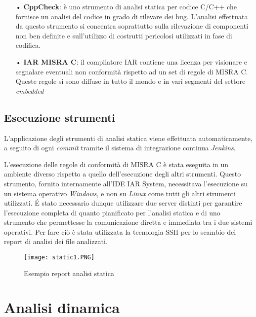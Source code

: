\begin{itemize}
\item[•] \textbf{CppCheck}: è uno strumento di analisi statica per codice C/C++ che fornisce un analisi del codice in grado di rilevare dei bug. L'analisi effettuata da questo strumento si concentra soprattutto sulla rilevazione di componenti non ben definite e sull'utilizzo di costrutti pericolosi utilizzati in fase di codifica.

\item[•] \textbf{IAR MISRA C}: il compilatore IAR contiene una licenza per visionare e segnalare eventuali non conformità rispetto ad un set di regole di MISRA C. Queste regole si sono diffuse in tutto il mondo e in vari segmenti del settore \textit{embedded}
\end{itemize}

\subsection{Esecuzione strumenti}
L'applicazione degli strumenti di analisi statica viene effettuata automaticamente, a seguito di ogni \textit{commit} tramite il sistema di integrazione continua \textit{Jenkins}.

L'esecuzione delle regole di conformità di MISRA C è stata eseguita in un ambiente diverso rispetto a quello dell'esecuzione degli altri strumenti. Questo strumento, fornito internamente all'IDE IAR System, necessitava l'esecuzione su un sistema operativo \textit{Windows}, e non su \textit{Linux} come tutti gli altri strumenti utilizzati. É stato necessario dunque utilizzare due server distinti per garantire l'esecuzione completa di quanto pianificato per l'analisi statica e di uno strumento che permettesse la comunicazione diretta e immediata tra i due sistemi operativi. Per fare ciò è stata utilizzata la tecnologia SSH per lo scambio dei report di analisi dei file analizzati.

\begin{figure}[H]
  \centering
  \texttt{[image: static1.PNG]}
  \caption{Esempio report analisi statica}
\end{figure}

\section{Analisi dinamica}

